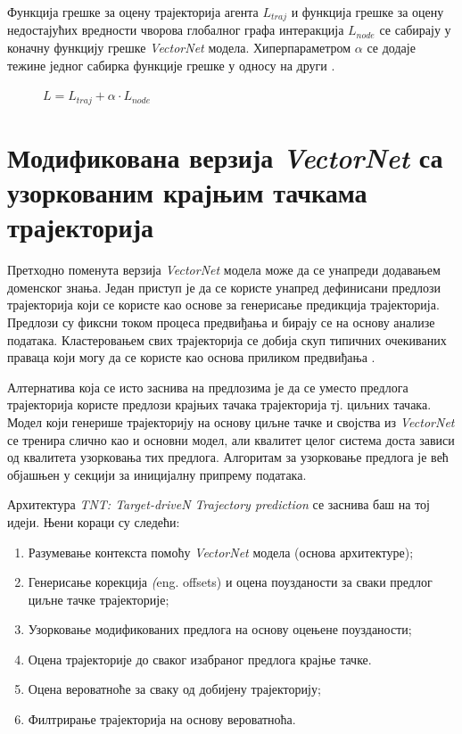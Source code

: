 \documentclass[11pt,oneside]{memoir}
\begin{document}
Функција грешке за оцену трајекторија агента $L_{traj}$ и функција грешке за оцену
недостајућих вредности чворова глобалног графа интеракција $L_{node}$ се сабирају у коначну функцију грешке \textit{VectorNet} модела.
Хиперпараметром $\alpha$ се додаје тежине једног сабирка функције грешке у односу на други \cite{vectornet}.

\begin{figure}[H]
  \centering
  $L = L_{traj} + \alpha \cdot L_{node}$
\end{figure}

\section{Модификована верзија \textit{VectorNet} са узоркованим крајњим тачкама трајекторија}

Претходно поменута верзија \textit{VectorNet} модела може да се унапреди додавањем доменског знања. Један приступ је да се користе унапред
дефинисани предлози трајекторија који се користе као основе за генерисање предикција трајекторија. Предлози су фиксни током процеса
предвиђања и бирају се на основу анализе података. Кластеровањем свих трајекторија се добија скуп типичних очекиваних праваца
који могу да се користе као основа приликом предвиђања \cite{multipath}.

Алтернатива која се исто заснива на предлозима је да се уместо предлога трајекторија користе предлози крајњих тачака трајекторија
тј. циљних тачака. Модел који генерише трајекторију на основу циљне тачке и својства из \textit{VectorNet} се тренира слично као и основни модел, 
али квалитет целог система доста зависи од квалитета узорковања тих предлога. Алгоритам за узорковање предлога је већ објашњен у секцији за
иницијалну припрему података.

Архитектура \textit{TNT: Target-driveN Trajectory prediction} \cite{tnt} се заснива баш на тој идеји. Њени кораци су следећи:
\begin{enumerate}
  \item Разумевање контекста помоћу \textit{VectorNet} модела (основа архитектуре);
  \item Генерисање корекција \textit(eng. offsets) и оцена поузданости за сваки предлог циљне тачке трајекторије;
  \item Узорковање модификованих предлога на основу оцењене поузданости;
  \item Оцена трајекторије до сваког изабраног предлога крајње тачке.
  \item Оцена вероватноће за сваку од добијену трајекторију;
  \item Филтрирање трајекторија на основу вероватноћа.
\end{enumerate}
\end{document}
